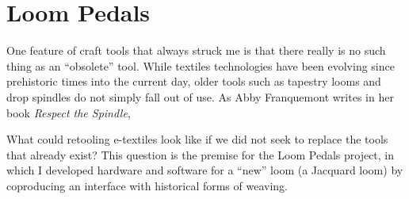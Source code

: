 \chapter{Loom Pedals}
\label{ch_loom-pedals}


One feature of craft tools that always struck me is that there really is no such thing as an ``obsolete'' tool. While textiles technologies have been evolving since prehistoric times into the current day, older tools such as tapestry looms and drop spindles do not simply fall out of use. As Abby Franquemont writes in her book \textit{Respect the Spindle}, 

What could retooling e-textiles look like if we did not seek to replace the tools that already exist? This question is the premise for the Loom Pedals project, in which I developed hardware and software for a ``new'' loom (a Jacquard loom) by coproducing an interface with historical forms of weaving.



